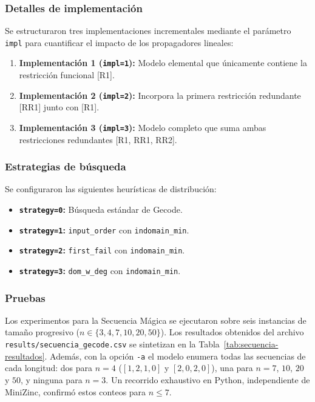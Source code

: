 \subsubsection{Detalles de implementación}
Se estructuraron tres implementaciones incrementales mediante el parámetro \texttt{impl} para cuantificar el impacto de los propagadores lineales:
\begin{enumerate}
    \item \textbf{Implementación 1 (\texttt{impl=1}):} Modelo elemental que únicamente contiene la restricción funcional [R1].
    \item \textbf{Implementación 2 (\texttt{impl=2}):} Incorpora la primera restricción redundante [RR1] junto con [R1].
    \item \textbf{Implementación 3 (\texttt{impl=3}):} Modelo completo que suma ambas restricciones redundantes [R1, RR1, RR2].
\end{enumerate}

\subsubsection{Estrategias de búsqueda}
Se configuraron las siguientes heurísticas de distribución:
\begin{itemize}
    \item \textbf{\texttt{strategy=0}:} Búsqueda estándar de Gecode.
    \item \textbf{\texttt{strategy=1}:} \texttt{input\_order} con \texttt{indomain\_min}.
    \item \textbf{\texttt{strategy=2}:} \texttt{first\_fail} con \texttt{indomain\_min}.
    \item \textbf{\texttt{strategy=3}:} \texttt{dom\_w\_deg} con \texttt{indomain\_min}.
\end{itemize}

\subsubsection{Pruebas}
Los experimentos para la Secuencia Mágica se ejecutaron sobre seis instancias de tamaño progresivo ($n \in \{3, 4, 7, 10, 20, 50\}$). Los resultados obtenidos del archivo \texttt{results/secuencia\_gecode.csv} se sintetizan en la Tabla~\ref{tab:secuencia-resultados}. Además, con la opción \texttt{-a} el modelo enumera todas las secuencias de cada longitud: dos para $n = 4$ ($[1, 2, 1, 0]$ y $[2, 0, 2, 0]$), una para $n = 7$, $10$, $20$ y $50$, y ninguna para $n = 3$. Un recorrido exhaustivo en Python, independiente de MiniZinc, confirmó estos conteos para $n \le 7$.

